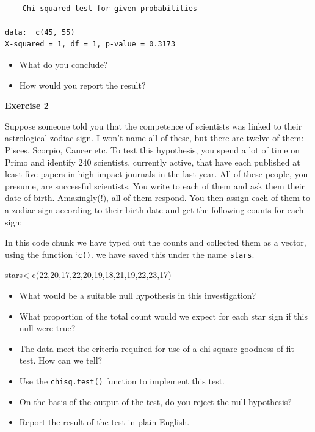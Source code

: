 \documentclass[
  letterpaper,
  DIV=11,
  numbers=noendperiod]{scrreprt}
\newenvironment{Shaded}{\begin{snugshade}}{\end{snugshade}}
\newcommand{\DecValTok}[1]{\textcolor[rgb]{0.68,0.00,0.00}{#1}}
\newcommand{\FunctionTok}[1]{\textcolor[rgb]{0.28,0.35,0.67}{#1}}
\newcommand{\NormalTok}[1]{\textcolor[rgb]{0.00,0.23,0.31}{#1}}
\newcommand{\OtherTok}[1]{\textcolor[rgb]{0.00,0.23,0.31}{#1}}
\providecommand{\tightlist}{%
  \setlength{\itemsep}{0pt}\setlength{\parskip}{0pt}}\usepackage{longtable,booktabs,array}
\begin{document}
\begin{verbatim}

    Chi-squared test for given probabilities

data:  c(45, 55)
X-squared = 1, df = 1, p-value = 0.3173
\end{verbatim}

\begin{itemize}
\item
  What do you conclude?
\item
  How would you report the result?
\end{itemize}

\textbf{Exercise 2}

Suppose someone told you that the competence of scientists was linked to
their astrological zodiac sign. I won't name all of these, but there are
twelve of them: Pisces, Scorpio, Cancer etc. To test this hypothesis,
you spend a lot of time on Primo and identify 240 scientists, currently
active, that have each published at least five papers in high impact
journals in the last year. All of these people, you presume, are
successful scientists. You write to each of them and ask them their date
of birth. Amazingly(!), all of them respond. You then assign each of
them to a zodiac sign according to their birth date and get the
following counts for each sign:

In this code chunk we have typed out the counts and collected them as a
vector, using the function `\texttt{c()\textasciigrave{}}. we have saved
this under the name \texttt{stars}.

\begin{Shaded}
\begin{Highlighting}[]
\NormalTok{stars}\OtherTok{\textless{}{-}}\FunctionTok{c}\NormalTok{(}\DecValTok{22}\NormalTok{,}\DecValTok{20}\NormalTok{,}\DecValTok{17}\NormalTok{,}\DecValTok{22}\NormalTok{,}\DecValTok{20}\NormalTok{,}\DecValTok{19}\NormalTok{,}\DecValTok{18}\NormalTok{,}\DecValTok{21}\NormalTok{,}\DecValTok{19}\NormalTok{,}\DecValTok{22}\NormalTok{,}\DecValTok{23}\NormalTok{,}\DecValTok{17}\NormalTok{)}
\end{Highlighting}
\end{Shaded}

\begin{itemize}
\tightlist
\item
  What would be a suitable null hypothesis in this investigation?
\item
  What proportion of the total count would we expect for each star sign
  if this null were true?
\item
  The data meet the criteria required for use of a chi-square goodness
  of fit test. How can we tell?
\item
  Use the \texttt{chisq.test()} function to implement this test.
\item
  On the basis of the output of the test, do you reject the null
  hypothesis?
\item
  Report the result of the test in plain English.
\end{itemize}
\end{document}
